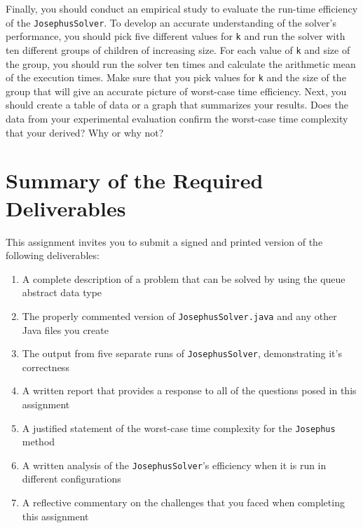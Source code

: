   Finally, you should conduct an empirical study to evaluate the run-time efficiency of the {\tt JosephusSolver}.  To
  develop an accurate understanding of the solver's performance, you should pick five different values for {\tt k} and
  run the solver with ten different groups of children of increasing size. For each value of {\tt k} and size of the
  group, you should run the solver ten times and calculate the arithmetic mean of the execution times. Make sure that
  you pick values for {\tt k} and the size of the group that will give an accurate picture of worst-case time
  efficiency. Next, you should create a table of data or a graph that summarizes your results. Does the data from your
  experimental evaluation confirm the worst-case time complexity that your derived? Why or why not?
  
\section*{Summary of the Required Deliverables}

  This assignment invites you to submit a signed and printed version of the following deliverables: 

  \begin{enumerate} 

  \item A complete description of a problem that can be solved by using the queue abstract data type

  \item The properly commented version of {\tt JosephusSolver.java} and any other Java files you create

  \item The output from five separate runs of {\tt JosephusSolver}, demonstrating it's correctness 

  \item A written report that provides a response to all of the questions posed in this assignment

  \item A justified statement of the worst-case time complexity for the {\tt Josephus} method

  \item A written analysis of the {\tt JosephusSolver}'s efficiency when it is run in different configurations 

  \item A reflective commentary on the challenges that you faced when completing this assignment 
   
  \end{enumerate}

